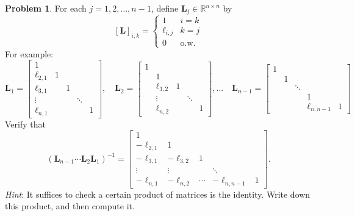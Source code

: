 \documentclass[12pt]{article}
\theoremstyle{definition}
\newtheorem{problem}{Problem}
\renewcommand{\vec}{\mathbf}
\begin{document}
\begin{problem}
For each $j=1,2, \ldots, n-1$, define $\vec{L}_j \in \mathbb{R}^{n\times n}$ by 
\[
    [\vec{L}]_{i,k} 
    = \begin{cases}
    1 & i=k \\
    \ell_{i,j} & k=j \\
    0 & \text{o.w.}
    \end{cases}
\]
For example:
\[
\vec{L}_1=
\begin{bmatrix}
1 &\\
\ell_{2,1} &1 \\
\ell_{3,1} &&1 \\
    \vdots & & & \ddots \\
    \ell_{n,1} &&&&1
\end{bmatrix}
,\quad
\vec{L}_2=
\begin{bmatrix}
1 &\\
&1 \\
&\ell_{3,2} &1 \\
    & \vdots &&\ddots \\
    &\ell_{n,2}&&&1
\end{bmatrix}
,\ldots\quad
    \vec{L}_{n-1}=
\begin{bmatrix}
1 &\\
&1 \\
&&\ddots \\
&&&1 \\
&&&\ell_{n,n-1}&1
\end{bmatrix}
    \]
Verify that
\[
(\vec{L}_{n-1} \cdots \vec{L}_2\vec{L}_1)^{-1}
=
\begin{bmatrix}
1 &\\
-\ell_{2,1} &1 \\
-\ell_{3,1} &-\ell_{3,2}&1 \\
\vdots & \vdots & & \ddots \\
    -\ell_{n,1} &-\ell_{n,2}&\cdots&-\ell_{n,n-1}&1
\end{bmatrix}.
\]
\emph{Hint}: It suffices to check a certain product of matrices is the identity.
Write down this product, and then compute it.
\end{problem}
\end{document}
